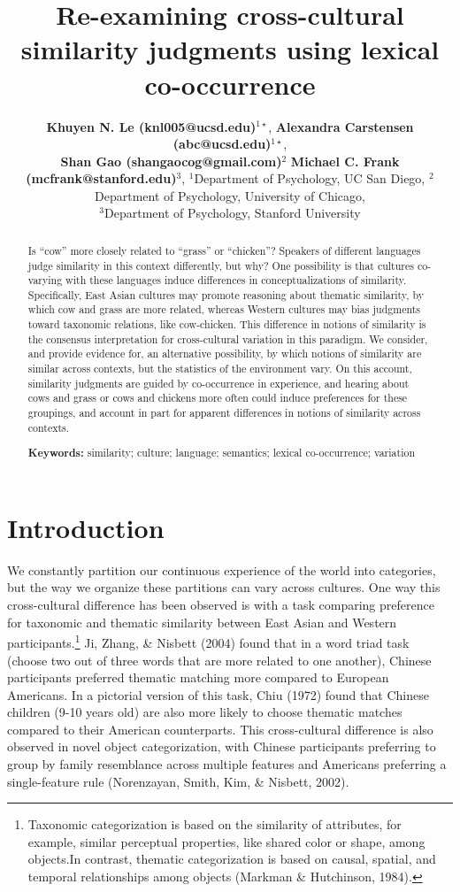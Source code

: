 \documentclass[10pt, letterpaper]{article}
\title{Re-examining cross-cultural similarity judgments using lexical
co-occurrence}
\author{{\large \bf Khuyen N. Le (knl005@ucsd.edu)}$^{1\star}$, {\large \bf Alexandra Carstensen (abc@ucsd.edu)}$^{1\star}$, \\ {\large \bf Shan Gao (shangaocog@gmail.com)$^2$} {\large \bf Michael C. Frank (mcfrank@stanford.edu)$^3$},  \AND $^1$Department of Psychology, UC San Diego, $^2$Department of Psychology, University of Chicago, \\ $^3$Department of Psychology, Stanford University }
\begin{document}
\maketitle

\begin{abstract}
Is ``cow'' more closely related to ``grass'' or ``chicken''? Speakers of
different languages judge similarity in this context differently, but
why? One possibility is that cultures co-varying with these languages
induce differences in conceptualizations of similarity. Specifically,
East Asian cultures may promote reasoning about thematic similarity, by
which cow and grass are more related, whereas Western cultures may bias
judgments toward taxonomic relations, like cow-chicken. This difference
in notions of similarity is the consensus interpretation for
cross-cultural variation in this paradigm. We consider, and provide
evidence for, an alternative possibility, by which notions of similarity
are similar across contexts, but the statistics of the environment vary.
On this account, similarity judgments are guided by co-occurrence in
experience, and hearing about cows and grass or cows and chickens more
often could induce preferences for these groupings, and account in part
for apparent differences in notions of similarity across contexts.

\textbf{Keywords:}
similarity; culture; language; semantics; lexical co-occurrence;
variation
\end{abstract}

\hypertarget{introduction}{%
\section{Introduction}\label{introduction}}

We constantly partition our continuous experience of the world into
categories, but the way we organize these partitions can vary across
cultures. One way this cross-cultural difference has been observed is
with a task comparing preference for taxonomic and thematic similarity
between East Asian and Western participants.\footnote{Taxonomic
  categorization is based on the similarity of attributes, for example,
  similar perceptual properties, like shared color or shape, among
  objects.In contrast, thematic categorization is based on causal,
  spatial, and temporal relationships among objects (Markman \&
  Hutchinson, 1984).} Ji, Zhang, \& Nisbett (2004) found that in a word
triad task (choose two out of three words that are more related to one
another), Chinese participants preferred thematic matching more compared
to European Americans. In a pictorial version of this task, Chiu (1972)
found that Chinese children (9-10 years old) are also more likely to
choose thematic matches compared to their American counterparts. This
cross-cultural difference is also observed in novel object
categorization, with Chinese participants preferring to group by family
resemblance across multiple features and Americans preferring a
single-feature rule (Norenzayan, Smith, Kim, \& Nisbett, 2002).
\end{document}
